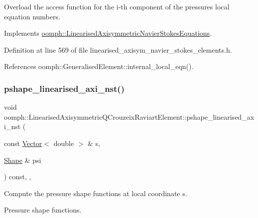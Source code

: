 Overload the access function for the i-\/th component of the pressure\textquotesingle{}s local equation numbers. 



Implements \hyperlink{classoomph_1_1LinearisedAxisymmetricNavierStokesEquations_a78d4ea2b8f4d23f8e942dc7bcb3fa4c5}{oomph\+::\+Linearised\+Axisymmetric\+Navier\+Stokes\+Equations}.



Definition at line 569 of file linearised\+\_\+axisym\+\_\+navier\+\_\+stokes\+\_\+elements.\+h.



References oomph\+::\+Generalised\+Element\+::internal\+\_\+local\+\_\+eqn().

\mbox{\label{classoomph_1_1LinearisedAxisymmetricQCrouzeixRaviartElement_aa04596314af005c461482c54e086f252}} 
\subsubsection{\texorpdfstring{pshape\+\_\+linearised\+\_\+axi\+\_\+nst()}{pshape\_linearised\_axi\_nst()}\hspace{0.1cm}{\footnotesize\ttfamily [1/2]}}
{\footnotesize\ttfamily void oomph\+::\+Linearised\+Axisymmetric\+Q\+Crouzeix\+Raviart\+Element\+::pshape\+\_\+linearised\+\_\+axi\+\_\+nst (\begin{DoxyParamCaption}\item[{const \hyperlink{classoomph_1_1Vector}{Vector}$<$ double $>$ \&}]{s,  }\item[{\hyperlink{classoomph_1_1Shape}{Shape} \&}]{psi }\end{DoxyParamCaption}) const\hspace{0.3cm}{\ttfamily [inline]}, {\ttfamily [protected]}, {\ttfamily [virtual]}}



Compute the pressure shape functions at local coordinate s. 

Pressure shape functions. 

